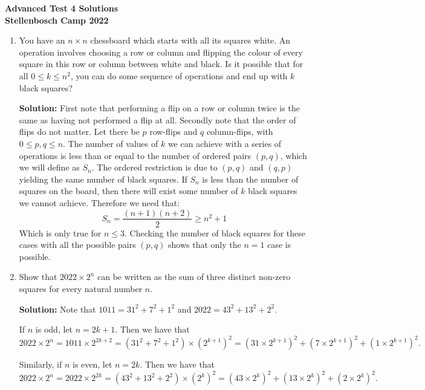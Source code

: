 \documentclass{article}
\begin{document}
\thispagestyle{empty}

\begin{center}
  \textbf{\Large Advanced Test 4 Solutions}
  \\ \vspace{1em}
  \textbf{\large Stellenbosch Camp 2022}
\end{center}

\bigskip \bigskip

\begin{enumerate}[itemsep=24pt]

\item %
You have an $n \times n$ chessboard which starts with all its squares white.
An operation involves choosing a row or column and flipping the colour of every square in this row or column between white and black.
Is it possible that for all $0 \leq k \leq n^2$, you can do some sequence of operations and end up with $k$ black squares?

\textbf{Solution:}
First note that performing a flip on a row or column twice is the same as having not performed a flip at all. Secondly note that the order of flips do not matter. Let there be $p$ row-flips and $q$ column-flips, with $0\leq p,q\leq n$. The number of values of $k$ we can achieve with a series of operations is less than or equal to the number of ordered pairs $(p,q)$, which we will define as $S_n$. The ordered restriction is due to $(p,q)$ and $(q,p)$ yielding the same number of black squares. If $S_n$ is less than the number of squares on the board, then there will exist some number of $k$ black squares we cannot achieve. Therefore we need that:
$$S_n = \frac{(n+1)(n+2)}{2} \geq n^2 + 1$$
Which is only true for $n\leq3$. Checking the number of black squares for these cases with all the possible pairs $(p,q)$ shows that only the $n=1$ case is possible.


\item %
Show that $2022 \times 2^n$ can be written as the sum of three distinct non-zero squares for every natural number $n$.

\textbf{Solution:}
Note that $1011 = 31^2 + 7^2 + 1^2$ and $2022 = 43^2 + 13^2 + 2^2$.

If $n$ is odd, let $n = 2k + 1$. Then we have that
\[
    2022 \times 2^n = 1011 \times 2^{2k + 2} = \left( 31^2 + 7^2 + 1^2 \right) \times {\left( 2^{k + 1} \right)}^2 = {\left( 31 \times 2^{k + 1} \right)}^2 + {\left( 7 \times 2^{k + 1} \right)}^2 + {\left( 1 \times 2^{k + 1} \right)}^2.
\]

Similarly, if $n$ is even, let $n = 2k$. Then we have that
\[
    2022 \times 2^n = 2022 \times 2^{2k} = \left( 43^2 + 13^2 + 2^2 \right) \times {\left( 2^{k} \right)}^2 = {\left( 43 \times 2^{k} \right)}^2 + {\left( 13 \times 2^{k} \right)}^2 + {\left( 2 \times 2^{k} \right)}^2.
\]



\end{enumerate}
\end{document}
